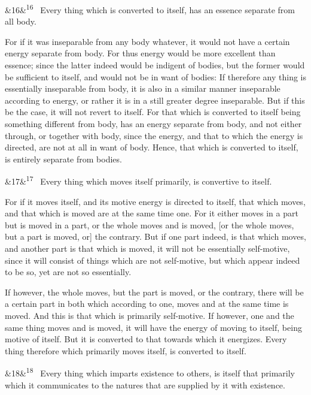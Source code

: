 \documentclass[12pt]{article}
\newcommand{\para}[1][]{\par\noindent\ifx&#1&\else\textsuperscript{\footnotesize #1}~\fi}
\begin{document}
\para[16] Every thing which is converted to itself, has an essence separate from all body.

For if it was inseparable from any body whatever, it would not have a certain energy separate from body. For thus energy would be more excellent than essence; since the latter indeed would be indigent of bodies, but the former would be sufficient to itself, and would not be in want of bodies: If therefore any thing is essentially inseparable from body, it is also in a similar manner inseparable according to energy, or rather it is in a still greater degree inseparable. But if this be the case, it will not revert to itself. For that which is converted to itself being something different from body, has an energy separate from body, and not either through, or together with body, since the energy, and that to which the energy is directed, are not at all in want of body. Hence, that which is converted to itself, is entirely separate from bodies.

\para[17] Every thing which moves itself primarily, is convertive to itself.

For if it moves itself, and its motive energy is directed to itself, that which moves, and that which is moved are at the same time one. For it either moves in a part but is moved in a part, or the whole moves and is moved, [or the whole moves, but a part is moved, or] the contrary. But if one part indeed, is that which moves, and another part is that which is moved, it will not be essentially self-motive, since it will consist of things which are not self-motive, but which appear indeed to be so, yet are not so essentially.

If however, the whole moves, but the part is moved, or the contrary, there will be a certain part in both which according to one, moves and at the same time is moved. And this is that which is primarily self-motive. If however, one and the same thing moves and is moved, it will have the energy of moving to itself, being motive of itself. But it is converted to that towards which it energizes. Every thing therefore which primarily moves itself, is converted to itself.

\para[18] Every thing which imparts existence to others, is itself that primarily which it communicates to the natures that are supplied by it with existence.
\end{document}

